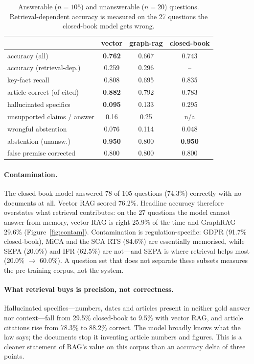 \documentclass[10pt,twocolumn]{article}
\begin{document}
\begin{table}[t]
\centering\footnotesize
\caption{Answerable ($n=105$) and unanswerable ($n=20$) questions. Retrieval-dependent accuracy is measured on the 27 questions the closed-book model gets wrong.}
\label{tab:kb}
\begin{tabular}{lccc}
\toprule
 & vector & graph-rag & closed-book\\
\midrule
accuracy (all) & \textbf{0.762} & 0.667 & 0.743\\
accuracy (retrieval-dep.) & 0.259 & 0.296 & --\\
key-fact recall & 0.808 & 0.695 & 0.835\\
article correct (of cited) & \textbf{0.882} & 0.792 & 0.783\\
hallucinated specifics & \textbf{0.095} & 0.133 & 0.295\\
unsupported claims / answer & 0.16 & 0.25 & n/a\\
wrongful abstention & 0.076 & 0.114 & 0.048\\
abstention (unansw.) & \textbf{0.950} & 0.800 & \textbf{0.950}\\
false premise corrected & 0.800 & 0.800 & 0.800\\
\bottomrule
\end{tabular}
\end{table}

\paragraph{Contamination.}
The closed-book model answered 78 of 105 questions (74.3\%) correctly with no documents at all. Vector RAG scored 76.2\%. Headline accuracy therefore overstates what retrieval contributes: on the 27 questions the model cannot answer from memory, vector RAG is right 25.9\% of the time and GraphRAG 29.6\% (Figure~\ref{fig:contam}). Contamination is regulation-specific: GDPR (91.7\% closed-book), MiCA and the SCA RTS (84.6\%) are essentially memorised, while SEPA (20.0\%) and IFR (62.5\%) are not---and SEPA is where retrieval helps most (20.0\% $\rightarrow$ 60.0\%). A question set that does not separate these subsets measures the pre-training corpus, not the system.

\paragraph{What retrieval buys is precision, not correctness.}
Hallucinated specifics---numbers, dates and articles present in neither gold answer nor context---fall from 29.5\% closed-book to 9.5\% with vector RAG, and article citations rise from 78.3\% to 88.2\% correct. The model broadly knows what the law says; the documents stop it inventing article numbers and figures. This is a cleaner statement of RAG's value on this corpus than an accuracy delta of three points.
\end{document}
